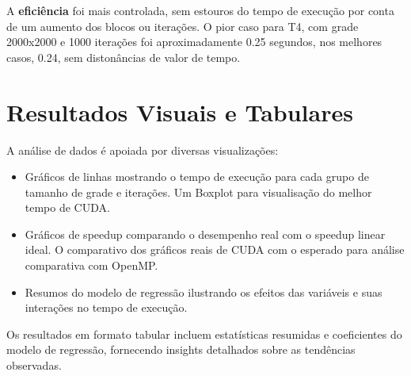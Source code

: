A \textbf{eficiência}  foi mais controlada, sem estouros do tempo de execução por conta de um aumento dos blocos ou iterações. O pior caso para T4, com grade 2000x2000 e 1000 iterações foi aproximadamente 0.25 segundos, nos melhores casos, 0.24, sem distonâncias de valor de tempo.

\section{Resultados Visuais e Tabulares}

A análise de dados é apoiada por diversas visualizações:
\begin{itemize}
    \item Gráficos de linhas mostrando o tempo de execução para cada grupo de tamanho de grade e iterações. Um Boxplot para visualisação do melhor tempo de CUDA.
    \item Gráficos de speedup comparando o desempenho real com o speedup linear ideal. O comparativo dos gráficos reais de CUDA com o esperado para análise comparativa com OpenMP.
    \item Resumos do modelo de regressão ilustrando os efeitos das variáveis e suas interações no tempo de execução.
\end{itemize}

Os resultados em formato tabular incluem estatísticas resumidas e coeficientes do modelo de regressão, fornecendo insights detalhados sobre as tendências observadas.

